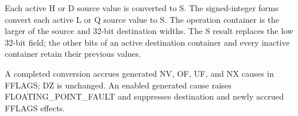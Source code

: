 Each active H or D source value is converted to S. The signed-integer forms
convert each active L or Q source value to S. The operation container is the
larger of the source and 32-bit destination widths. The S result replaces the
low 32-bit field; the other bits of an active destination container and every
inactive container retain their previous values.

A completed conversion accrues generated NV, OF, UF, and NX causes in FFLAGS;
DZ is unchanged. An enabled generated cause raises FLOATING\_POINT\_FAULT and
suppresses destination and newly accrued FFLAGS effects.
